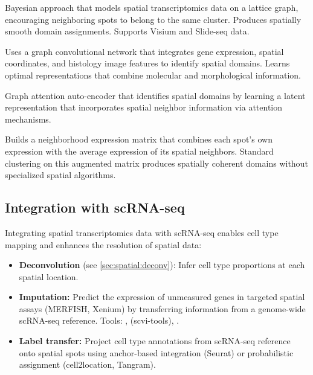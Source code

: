 \begin{description}[style=nextline]
  \item[\software{BayesSpace}] Bayesian approach that models spatial
    transcriptomics data on a lattice graph, encouraging neighboring spots to
    belong to the same cluster. Produces spatially smooth domain assignments.
    Supports Visium and Slide-seq data.
  \item[\software{SpaGCN}] Uses a graph convolutional network that integrates
    gene expression, spatial coordinates, and histology image features to
    identify spatial domains. Learns optimal representations that combine
    molecular and morphological information.
  \item[\software{STAGATE}] Graph attention auto-encoder that identifies spatial
    domains by learning a latent representation that incorporates spatial
    neighbor information via attention mechanisms.
  \item[\software{BANKSY}] Builds a neighborhood expression matrix that
    combines each spot's own expression with the average expression of its
    spatial neighbors. Standard clustering on this augmented matrix produces
    spatially coherent domains without specialized spatial algorithms.
\end{description}

\subsection{Integration with scRNA-seq}

Integrating spatial transcriptomics data with scRNA-seq enables cell type
mapping and enhances the resolution of spatial data:

\begin{itemize}[nosep]
  \item \textbf{Deconvolution} (see \cref{sec:spatial:deconv}): Infer cell type
    proportions at each spatial location.
  \item \textbf{Imputation:} Predict the expression of unmeasured genes in
    targeted spatial assays (MERFISH, Xenium) by transferring information from
    a genome-wide scRNA-seq reference. Tools: ,
     (scvi-tools), .
  \item \textbf{Label transfer:} Project cell type annotations from scRNA-seq
    reference onto spatial spots using anchor-based integration (Seurat) or
    probabilistic assignment (cell2location, Tangram).
\end{itemize}

